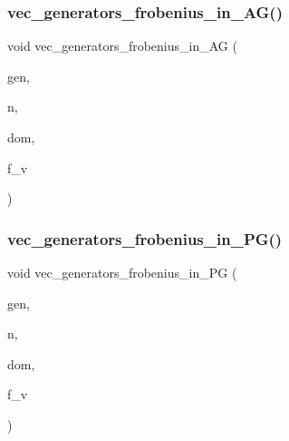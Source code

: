 \mbox{\label{perm__group__gens_8_c_aa7e25c62e5735b9785e9dfa02413cbab}} 
\subsubsection{\texorpdfstring{vec\+\_\+generators\+\_\+frobenius\+\_\+in\+\_\+\+A\+G()}{vec\_generators\_frobenius\_in\_AG()}}
{\footnotesize\ttfamily void vec\+\_\+generators\+\_\+frobenius\+\_\+in\+\_\+\+AG (\begin{DoxyParamCaption}\item[{\mbox{\hyperlink{class_vector}{Vector}} \&}]{gen,  }\item[{\mbox{\hyperlink{galois_8h_a09fddde158a3a20bd2dcadb609de11dc}{I\+NT}}}]{n,  }\item[{\mbox{\hyperlink{classdomain}{domain}} $\ast$}]{dom,  }\item[{\mbox{\hyperlink{galois_8h_a09fddde158a3a20bd2dcadb609de11dc}{I\+NT}}}]{f\+\_\+v }\end{DoxyParamCaption})}

\mbox{\label{perm__group__gens_8_c_a9e10945efd7f35b31fdeb07fa51a86a7}} 
\subsubsection{\texorpdfstring{vec\+\_\+generators\+\_\+frobenius\+\_\+in\+\_\+\+P\+G()}{vec\_generators\_frobenius\_in\_PG()}}
{\footnotesize\ttfamily void vec\+\_\+generators\+\_\+frobenius\+\_\+in\+\_\+\+PG (\begin{DoxyParamCaption}\item[{\mbox{\hyperlink{class_vector}{Vector}} \&}]{gen,  }\item[{\mbox{\hyperlink{galois_8h_a09fddde158a3a20bd2dcadb609de11dc}{I\+NT}}}]{n,  }\item[{\mbox{\hyperlink{classdomain}{domain}} $\ast$}]{dom,  }\item[{\mbox{\hyperlink{galois_8h_a09fddde158a3a20bd2dcadb609de11dc}{I\+NT}}}]{f\+\_\+v }\end{DoxyParamCaption})}


